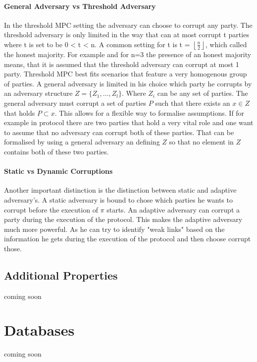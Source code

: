 \paragraph{General Adversary vs Threshold Adversary}
In the threshold MPC setting the adversary can choose to corrupt any party. The threshold adversary is only limited in the way that can at most corrupt t parties where t is set to be 0 < t < n. A common setting for t is t = $\left \lfloor{ \frac{n}{2} }\right \rfloor  $, which called the honest majority. For example and for n=3 the presence of an honest majority means, that it is assumed that the threshold adversary can corrupt at most 1 party. Threshold MPC best fits scenarios that feature a very homogenous group of parties. A general adversary is limited in his choice which party he corrupts by an adversary structure  
$ Z = \{ Z_1, \dots, Z_l  \} $. Where $ Z_i $ can be any set of parties. The general adversary must corrupt a set of parties  $ P $ such that there exists an $ x \in Z $ that holds $ P \subset x $. This allows for a flexible way to formalise assumptions. If for example in protocol there are two parties that hold a very vital role and one want to assume that no adversary can corrupt both of these parties. That can be formalised by using a general adversary an defining $ Z $ so that no element in  $Z $ contains both of these two parties.  
 
\paragraph{Static vs Dynamic Corruptions}
Another important distinction is the distinction between static and adaptive adversary's. A static adversary is bound to chose which parties he wants to corrupt before the execution of $ \pi $ starts. An adaptive adversary can corrupt a party during the execution of the protocol. This makes the adaptive adversary much more powerful. As he can try to identify "weak links" based on the information he gets during the execution of the protocol and then choose corrupt those.   


\subsection{Additional Properties}
coming soon
\section{Databases}
coming soon